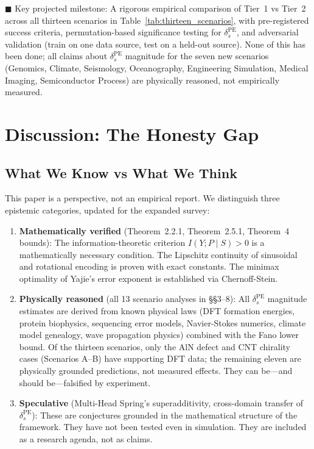 \documentclass[12pt,a4paper]{article}
\begin{document}
\textcolor{projected}{$\blacksquare$ Key projected milestone}: A rigorous empirical comparison of Tier~1 vs Tier~2 across all thirteen scenarios in Table~\ref{tab:thirteen_scenarios}, with pre-registered success criteria, permutation-based significance testing for $\delta_s^{\mathrm{PE}}$, and adversarial validation (train on one data source, test on a held-out source). None of this has been done; all claims about $\delta_s^{\mathrm{PE}}$ magnitude for the seven new scenarios (Genomics, Climate, Seismology, Oceanography, Engineering Simulation, Medical Imaging, Semiconductor Process) are physically reasoned, not empirically measured.

\section{Discussion: The Honesty Gap}

\subsection{What We Know vs What We Think}

This paper is a perspective, not an empirical report. We distinguish three epistemic categories, updated for the expanded survey:

\begin{enumerate}[nosep]
\item \textbf{Mathematically verified} (Theorem~2.2.1, Theorem~2.5.1, Theorem~4 bounds): The information-theoretic criterion $I(Y;P \mid S) > 0$ is a mathematically necessary condition. The Lipschitz continuity of sinusoidal and rotational encoding is proven with exact constants. The minimax optimality of Yajie's error exponent is established via Chernoff-Stein.
\item \textbf{Physically reasoned} (all 13 scenario analyses in \S\S3--8): All $\delta_s^{\mathrm{PE}}$ magnitude estimates are derived from known physical laws (DFT formation energies, protein biophysics, sequencing error models, Navier-Stokes numerics, climate model genealogy, wave propagation physics) combined with the Fano lower bound. Of the thirteen scenarios, only the AlN defect and CNT chirality cases (Scenarios A--B) have supporting DFT data; the remaining eleven are physically grounded predictions, not measured effects. They can be---and should be---falsified by experiment.
\item \textbf{Speculative} (Multi-Head Spring's superadditivity, cross-domain transfer of $\delta_s^{\mathrm{PE}}$): These are conjectures grounded in the mathematical structure of the framework. They have not been tested even in simulation. They are included as a research agenda, not as claims.
\end{enumerate}
\end{document}
